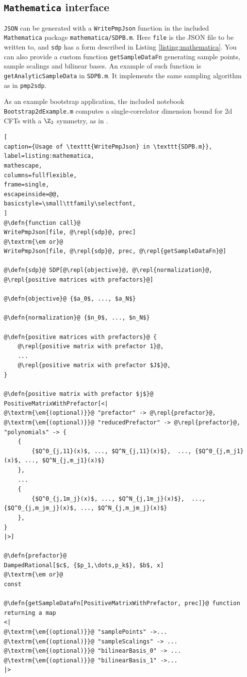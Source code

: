 \documentclass[12pt]{article}
\numberwithin{equation}{section}
\newcommand\repl[1]{$\langle$\textrm{\em #1}$\rangle$}
\newcommand\defn[1]{\textrm{\em #1}\ $\equiv$}
\begin{document}
\subsection{\texttt{Mathematica} interface}

\texttt{JSON} can be generated with a \texttt{WritePmpJson} function in the included \texttt{Mathematica} package \texttt{mathematica/SDPB.m}.
Here \texttt{file} is the JSON file to be written to, and \texttt{sdp} has a form described in Listing \ref{listing:mathematica}.
You can also provide a custom function \texttt{getSampleDataFn} generating sample points, sample scalings and bilinear bases.
An example of such function is \texttt{getAnalyticSampleData} in \texttt{SDPB.m}.
It implements the same sampling algorithm as in \texttt{pmp2sdp}.


As an example bootstrap application, the included notebook \texttt{Bootstrap2dExample.m} computes a single-correlator dimension bound for 2d CFTs with a $\Z_2$ symmetry, as in \cite{Rychkov:2009ij}.

\begin{lstlisting}[
caption={Usage of \texttt{WritePmpJson} in \texttt{SDPB.m}},
label=listing:mathematica,
mathescape,
columns=fullflexible,
frame=single,
escapeinside=@@,
basicstyle=\small\ttfamily\selectfont,
]
@\defn{function call}@
WritePmpJson[file, @\repl{sdp}@, prec]
@\textrm{\em or}@
WritePmpJson[file, @\repl{sdp}@, prec, @\repl{getSampleDataFn}@] 

@\defn{sdp}@ SDP[@\repl{objective}@, @\repl{normalization}@, @\repl{positive matrices with prefactors}@]

@\defn{objective}@ {$a_0$, ..., $a_N$}

@\defn{normalization}@ {$n_0$, ..., $n_N$}

@\defn{positive matrices with prefactors}@ {
	@\repl{positive matrix with prefactor 1}@,
	...
	@\repl{positive matrix with prefactor $J$}@,
}

@\defn{positive matrix with prefactor $j$}@
PositiveMatrixWithPrefactor[<|
@\textrm{\em{(optional)}}@ "prefactor" -> @\repl{prefactor}@,
@\textrm{\em{(optional)}}@ "reducedPrefactor" -> @\repl{prefactor}@,
"polynomials" -> {
	{
		{$Q^0_{j,11}(x)$, ..., $Q^N_{j,11}(x)$},  ..., {$Q^0_{j,m_j1}(x)$, ..., $Q^N_{j,m_j1}(x)$}
	},
	...
	{
		{$Q^0_{j,1m_j}(x)$, ..., $Q^N_{j,1m_j}(x)$},  ..., {$Q^0_{j,m_jm_j}(x)$, ..., $Q^N_{j,m_jm_j}(x)$}
	},
}
|>]

@\defn{prefactor}@
DampedRational[$c$, {$p_1,\dots,p_k$}, $b$, x]
@\textrm{\em or}@
const  

@\defn{getSampleDataFn[PositiveMatrixWithPrefactor, prec]}@ function returning a map
<|
@\textrm{\em{(optional)}}@ "samplePoints" ->...
@\textrm{\em{(optional)}}@ "sampleScalings" -> ...
@\textrm{\em{(optional)}}@ "bilinearBasis_0" -> ...
@\textrm{\em{(optional)}}@ "bilinearBasis_1" ->...
|>
\end{lstlisting}
\end{document}

